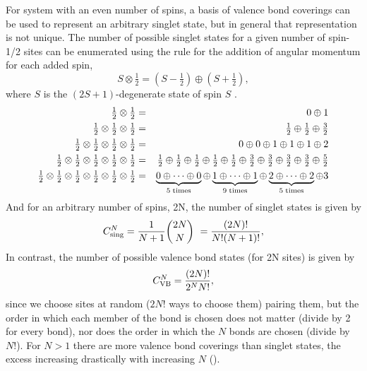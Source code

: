 For system with an even number of spins, a basis of valence bond coverings can be used to represent an arbitrary singlet state, but in general that representation is not unique.
The number of possible singlet states for a given number of spin-1/2 sites can be enumerated
using the rule for the addition of angular momentum for each added spin,
\begin{equation}
	S\otimes \tfrac{1}{2}  = \left(S-\tfrac{1}{2}\right)\oplus\left(S+\tfrac{1}{2}\right),
\end{equation}
where $S$ is the $(2S+1)$-degenerate state of spin $S$ \cite{Beach2006}.
\begin{eqnarray}
	\tfrac{1}{2} \otimes \tfrac{1}{2}  &=& 0 \oplus 1\nonumber \\ 
	\tfrac{1}{2} \otimes \tfrac{1}{2}  \otimes \tfrac{1}{2} &=& 
	\tfrac{1}{2} \oplus  \tfrac{1}{2} \oplus  \tfrac{3}{2} \nonumber \\
	\tfrac{1}{2} \otimes \tfrac{1}{2}  \otimes \tfrac{1}{2} \otimes \tfrac{1}{2} &=& 
	0 \oplus 0 \oplus 1 \oplus 1 \oplus 1 \oplus 2 \nonumber \\
	\tfrac{1}{2} \otimes \tfrac{1}{2}  \otimes \tfrac{1}{2}  \otimes \tfrac{1}{2}  \otimes \tfrac{1}{2}&=& 
	\tfrac{1}{2} \oplus \tfrac{1}{2} \oplus \tfrac{1}{2} \oplus \tfrac{1}{2} \oplus \tfrac{1}{2} \oplus  
	\tfrac{3}{2} \oplus \tfrac{3}{2} \oplus \tfrac{3}{2} \oplus \tfrac{3}{2} \oplus
	  \tfrac{5}{2} \nonumber \\
	\tfrac{1}{2} \otimes \tfrac{1}{2}  \otimes \tfrac{1}{2} \otimes \tfrac{1}{2} \otimes \tfrac{1}{2}
	\otimes \tfrac{1}{2} &=& 
	\underbrace{0 \oplus\cdots \oplus 0}_{5 \rm{\; times}} \oplus 
	\underbrace{1 \oplus \cdots \oplus 1}_{9 \rm{\; times}} \oplus 
	\underbrace{2 \oplus \cdots \oplus 2}_{5 \rm{\; times}} 
	\oplus 3 \nonumber
\end{eqnarray}
And for an arbitrary number of spins, 2N, the number of singlet states is given by 
\begin{equation}
	C_{\rm{sing}}^N = \frac{1}{N+1}\binom{2N}{N}\ = \frac{(2N)!}{N!(N+1)!},
\end{equation}  
In contrast, the number of possible valence bond states (for 2N sites) is given by
\begin{equation}
	C_{\rm{VB}}^N =
	\frac{(2N)!}{2^NN!},
\end{equation}
since we choose sites at random ($2N!$ ways to choose them) pairing them, but the order 
in which each member of the bond is chosen does not matter (divide by 2 for every bond), 
nor does the order in which the $N$ bonds are chosen (divide by $N!$).
For $N>1$ there are more valence bond coverings than singlet states, the excess increasing 
drastically with increasing $N$ ().  

